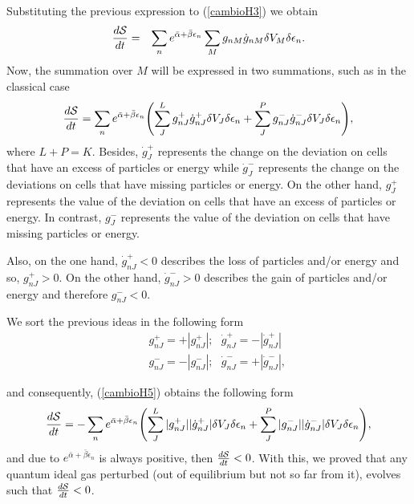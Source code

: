 %
Substituting the previous expression to (\ref{cambioH3}) we obtain
%
\begin{eqnarray}
   \frac{d\mathcal{S}}{dt}&=&  \sum_n e^{\bar{\alpha}+\bar{\beta}\epsilon_n}\sum_M  g_{nM}\dot{g}_{nM} \delta V_M\delta \epsilon_n. \nonumber \\ \label{cambioH4}
\end{eqnarray}
%
Now, the summation over $M$ will be expressed in two summations, such as in the
classical case
%
\begin{equation}
    \frac{d\Ss}{dt}=\sum_n  e^{\bar{\alpha}+\bar{\beta}\epsilon_n}\left(\sum_J ^{L} g^{+}_{nJ}\dot{g}^{+}_{nJ}\de V_J \delta \epsilon_n+\sum^{P}_J  g^{-}_{nJ}\dot{g}^{-}_{nJ} \de V_J\delta \epsilon_n \right), \label{cambioH5}
\end{equation}
%
where $L+P=K$. Besides, $\dot{g}^{+}_{J}$ represents the change on the
deviation on cells that have an excess of particles or energy while
$\dot{g}^{-}_{J}$  represents the change on the deviations on cells that have
missing particles or energy.
On the other hand, $g^{+}_{J}$  represents the value of the deviation on cells
that have an excess of particles or energy. In contrast, $g^{-}_{J}$ represents
the value of the deviation on cells that have missing particles or energy.

Also, on the one hand, $\dot{g}^{+}_{nJ}<0$ describes the loss of particles
and/or energy and so, $g^{+}_{nJ}>0$. On the other hand, $\dot{g}^{-}_{nJ}>0$
describes the gain of particles and/or energy and therefore $g^{-}_{nJ}<0$.

We sort the previous ideas in the following form
%
\begin{eqnarray}
   &&g^{+}_{nJ}=+|g^{+}_{nJ}|; \ \ \  \dot{g}^{+}_{nJ}=-|\dot{g}^{+}_{nJ}| \nonumber \\
   &&g^{-}_{nJ}=-|g^{-}_{nJ}|; \ \ \ \dot{g}^{-}_{nJ}=+|\dot{g}^{-}_{nJ}| \label{separacion},
\end{eqnarray}
%


and consequently, (\ref{cambioH5}) obtains the following form
%
\begin{equation}
    \frac{d\Ss}{dt}=-\sum_n  e^{\bar{\alpha}+\bar{\beta}\epsilon_n}\left(\sum_J ^{L} |g^{+}_{nJ}||\dot{g}^{+}_{nJ}|\de V_J \delta \epsilon_n+\sum^{P}_J  |g^{-}_{nJ}||\dot{g}^{-}_{nJ}| \de V_J \delta \epsilon_n \right), \label{cambioH6}
\end{equation}
%
and due to $e^{\bar{\alpha}+\bar{\beta}\epsilon_n}$ is always positive, then
$\frac{d\mathcal{S}}{dt}<0$. With this, we proved that any quantum ideal gas perturbed
(out of equilibrium but not so far from it), evolves such that
$\frac{d\mathcal{S}}{dt}<0$.


